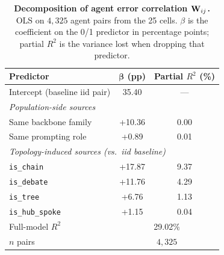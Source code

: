 \begin{table}[!t]
\centering
\small
\setlength{\tabcolsep}{6pt}
\begin{tabular}{l c c}
\toprule
\textbf{Predictor} & $\bm{\beta}$ \textbf{(pp)} & \textbf{Partial $R^2$ (\%)} \\
\midrule
Intercept (baseline iid pair)        & 35.40        & ---  \\
\midrule
\multicolumn{3}{l}{\textit{Population-side sources}}\\
Same backbone family                 & +10.36       & 0.00  \\
Same prompting role                  & +0.89        & 0.01  \\
\midrule
\multicolumn{3}{l}{\textit{Topology-induced sources (vs.\ iid baseline)}}\\
\texttt{is\_chain}                   & +17.87       & 9.37  \\
\texttt{is\_debate}                  & +11.76       & 4.29  \\
\texttt{is\_tree}                    & +6.76        & 1.13  \\
\texttt{is\_hub\_spoke}              & +1.15        & 0.04  \\
\midrule
Full-model $R^2$                     & \multicolumn{2}{c}{29.02\%} \\
$n$ pairs                            & \multicolumn{2}{c}{$4{,}325$} \\
\bottomrule
\end{tabular}
\caption{\textbf{Decomposition of agent error correlation
$\mathbf{W}_{ij}$.} OLS on $4{,}325$ agent pairs from the 25 cells.
$\beta$ is the coefficient on the 0/1 predictor in percentage
points; partial $R^2$ is the variance lost when dropping that
predictor.}
\label{tab:w-decomp}
\end{table}
